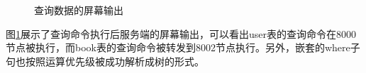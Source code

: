 \begin{figure}[H]
    \centering
    \caption{查询数据的屏幕输出}
    \label{fig:select-log}
\end{figure}

图\ref{fig:select-log}展示了查询命令执行后服务端的屏幕输出，可以看出user表的查询命令在8000节点被执行，而book表的查询命令被转发到8002节点执行。另外，嵌套的where子句也按照运算优先级被成功解析成树的形式。

